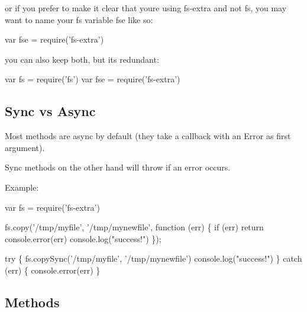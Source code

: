 or if you prefer to make it clear that you\textquotesingle{}re using {\ttfamily fs-\/extra} and not {\ttfamily fs}, you may want to name your {\ttfamily fs} variable {\ttfamily fse} like so\+:


\begin{DoxyCode}
var fse = require('fs-extra')
\end{DoxyCode}


you can also keep both, but it\textquotesingle{}s redundant\+:


\begin{DoxyCode}
var fs = require('fs')
var fse = require('fs-extra')
\end{DoxyCode}


\subsection*{Sync vs Async }

Most methods are async by default (they take a callback with an {\ttfamily Error} as first argument).

Sync methods on the other hand will throw if an error occurs.

Example\+:


\begin{DoxyCode}
var fs = require('fs-extra')

fs.copy('/tmp/myfile', '/tmp/mynewfile', function (err) \{
  if (err) return console.error(err)
  console.log("success!")
\});

try \{
  fs.copySync('/tmp/myfile', '/tmp/mynewfile')
  console.log("success!")
\} catch (err) \{
  console.error(err)
\}
\end{DoxyCode}


\subsection*{Methods }



